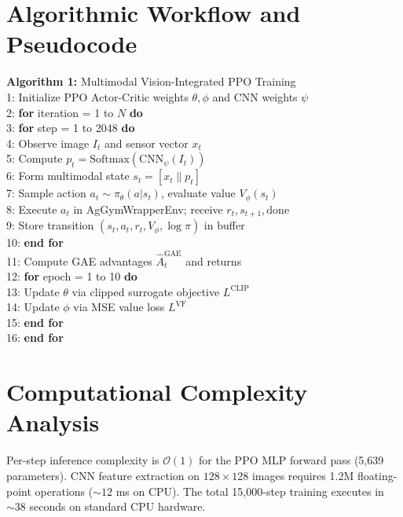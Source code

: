 \documentclass[12pt,a4paper]{report}
\begin{document}
\section{Algorithmic Workflow and Pseudocode}
\begin{tabbing}
\textbf{Algorithm 1:} Multimodal Vision-Integrated PPO Training \\
1: \quad Initialize PPO Actor-Critic weights $\theta, \phi$ and CNN weights $\psi$ \\
2: \quad \textbf{for} iteration = 1 to $N$ \textbf{do} \\
3: \quad\quad \textbf{for} step = 1 to 2048 \textbf{do} \\
4: \quad\quad\quad Observe image $I_t$ and sensor vector $x_t$ \\
5: \quad\quad\quad Compute $p_t = \text{Softmax}(\text{CNN}_\psi(I_t))$ \\
6: \quad\quad\quad Form multimodal state $s_t = [x_t \parallel p_t]$ \\
7: \quad\quad\quad Sample action $a_t \sim \pi_\theta(a | s_t)$, evaluate value $V_\phi(s_t)$ \\
8: \quad\quad\quad Execute $a_t$ in AgGymWrapperEnv; receive $r_t, s_{t+1}, \text{done}$ \\
9: \quad\quad\quad Store transition $(s_t, a_t, r_t, V_\phi, \log \pi)$ in buffer \\
10: \quad\quad \textbf{end for} \\
11: \quad\quad Compute GAE advantages $\hat{A}_t^{\text{GAE}}$ and returns \\
12: \quad\quad \textbf{for} epoch = 1 to 10 \textbf{do} \\
13: \quad\quad\quad Update $\theta$ via clipped surrogate objective $L^{\text{CLIP}}$ \\
14: \quad\quad\quad Update $\phi$ via MSE value loss $L^{\text{VF}}$ \\
15: \quad\quad \textbf{end for} \\
16: \quad \textbf{end for}
\end{tabbing}

\section{Computational Complexity Analysis}
Per-step inference complexity is $\mathcal{O}(1)$ for the PPO MLP forward pass (5,639 parameters). CNN feature extraction on $128 \times 128$ images requires 1.2M floating-point operations ($\sim 12$ ms on CPU). The total 15,000-step training executes in $\sim 38$ seconds on standard CPU hardware.
\end{document}
